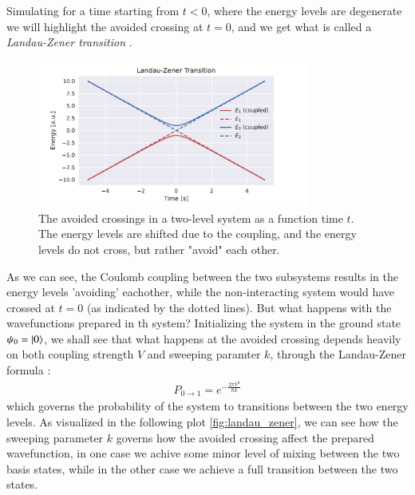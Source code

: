 \documentclass{subfiles}
\begin{document}
\\ \\



Simulating for a time starting from $t<0$, where the energy levels are degenerate we will highlight the avoided crossing at $t=0$, and we get what is called a \emph{Landau-Zener transition} \cite{landau1932theorie, zener1932non}. 
\begin{figure}[h!]
    \centering
    \includegraphics[width=0.8\textwidth]{figs/avoided_crossing.pdf}
    \caption{The avoided crossings in a two-level system as a function time $t$. The energy levels are shifted due to the coupling, and the energy levels do not cross, but rather "avoid" each other.}
    \label{fig:avoided_crossings}
\end{figure}
As we can see, the Coulomb coupling between the two subsystems results in the energy levels 'avoiding' eachother, while the non-interacting system would have crossed at $t=0$ (as indicated by the dotted lines). But what happens with the wavefunctions prepared in th system? Initializing the system in the ground state $\psi_0 = \ket{0}$, we shall see that what happens at the avoided crossing depends heavily on both coupling strength $V$ and sweeping paramter $k$, through the Landau-Zener formula \cite{landau1932theorie, zener1932non}:
\begin{align*}
    P_{0\rightarrow1} = e^{-\frac{2\pi V^2}{\hbar k}}
\end{align*}
which governs the probability of the system to transitions between the two energy levels. As visualized in the following plot \eqref{fig:landau_zener}, we can see how the sweeping parameter $k$ governs how the avoided crossing affect the prepared wavefunction, in one case we achive some minor level of mixing between the two basis states, while in the other case we achieve a full transition between the two states.
\end{document}
